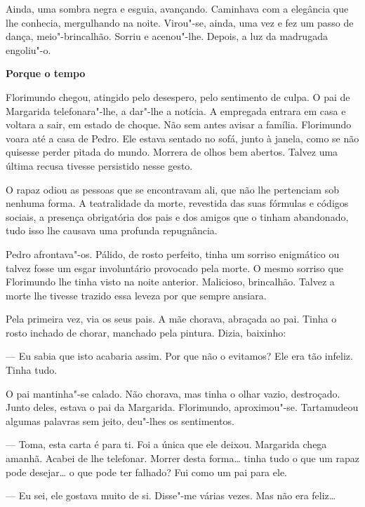 Ainda, uma sombra negra e esguia, avançando. Caminhava com a elegância
que lhe conhecia, mergulhando na noite. Virou"-se, ainda, uma vez e fez
um passo de dança, meio"-brincalhão. Sorriu e acenou"-lhe. Depois, a luz
da madrugada engoliu"-o.

\vspace*{1.8cm}
\noindent{}\textbf{Porque o tempo}

\bigskip

Florimundo chegou, atingido pelo desespero, pelo sentimento de culpa. O
pai de Margarida telefonara"-lhe, a dar"-lhe a notícia. A empregada
entrara em casa e voltara a sair, em estado de choque. Não sem antes
avisar a família. Florimundo voara até a casa de Pedro. Ele estava
sentado no sofá, junto à janela, como se não quisesse perder pitada do
mundo. Morrera de olhos bem abertos. Talvez uma última recusa tivesse
persistido nesse gesto.

O rapaz odiou as pessoas que se encontravam ali, que não lhe pertenciam
sob nenhuma forma. A teatralidade da morte, revestida das suas fórmulas
e códigos sociais, a presença obrigatória dos pais e dos amigos que o
tinham abandonado, tudo isso lhe causava uma profunda repugnância.

Pedro afrontava"-os. Pálido, de rosto perfeito, tinha um sorriso
enigmático ou talvez fosse um esgar involuntário provocado pela morte. O
mesmo sorriso que Florimundo lhe tinha visto na noite anterior.
Malicioso, brincalhão. Talvez a morte lhe tivesse trazido essa leveza
por que sempre ansiara.

Pela primeira vez, via os seus pais. A mãe chorava, abraçada ao pai.
Tinha o rosto inchado de chorar, manchado pela pintura. Dizia, baixinho:

--- Eu sabia que isto acabaria assim. Por que não o evitamos? Ele era tão
infeliz. Tinha tudo.

O pai mantinha"-se calado. Não chorava, mas tinha o olhar vazio,
destroçado. Junto deles, estava o pai da Margarida. Florimundo,
aproximou"-se. Tartamudeou algumas palavras sem jeito, deu"-lhes os
sentimentos.

--- Toma, esta carta é para ti. Foi a única que ele deixou. Margarida
chega amanhã. Acabei de lhe telefonar. Morrer desta forma\ldots{} tinha
tudo o que um rapaz pode desejar\ldots{} o que pode ter falhado? Fui como um
pai para ele.

--- Eu sei, ele gostava muito de si. Disse"-me várias vezes. Mas não era
feliz\ldots{}

